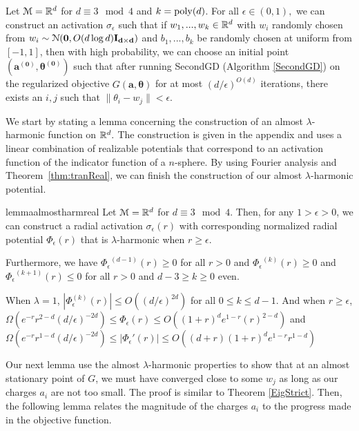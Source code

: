 %
%
\begin{theorem}\label{almostHarmSGD}
  Let $\mathcal{M} = {\mathbb{R}}^{d}$ for $d \equiv 3 \mod 4$ and
  $k = \mathrm{poly}(d)$. For all $\epsilon \in (0,1),$ we can construct an
  activation $\sigma_\epsilon$ such that if $w_1,...,w_k \in {\mathbb{R}}^d$
  with $w_i$ randomly chosen from
  $w_i \sim \mathcal{N}({\bf 0}, O(d\log d){\bf I_{d\times d}})$ and
  $b_1,...,b_k$ be randomly chosen at uniform from $[-1,1]$, then with
  high probability, we can choose an initial point
  $(\boldsymbol{a^{(0)}, \theta^{(0)}})$ such that after running
  SecondGD (Algorithm \ref{SecondGD}) on the regularized objective
  $G(\boldsymbol{a,\theta})$ for at most $(d/\epsilon)^{O(d)}$
  iterations, there exists an $i, j$ such that
  $\|\theta_i - w_j\| < \epsilon$.
\end{theorem}
%
We start by stating a lemma concerning the construction of an almost
$\lambda$-harmonic function on ${\mathbb{R}}^d.$ The construction is given in the appendix and uses a linear combination of realizable potentials that correspond to an activation function of the indicator function of a $n$-sphere. By using Fourier analysis and Theorem~\ref{thm:tranReal}, we can finish the construction of our almost $\lambda$-harmonic potential.%
%
\begin{restatable}{lemma}{almostharmreal}\label{almostHarmReal}
Let $\mathcal{M} = {\mathbb{R}}^d$ for $d \equiv 3 \mod 4$. Then, for any $1 > \epsilon > 0$, we can construct a radial activation $\sigma_\epsilon(r)$ with corresponding normalized radial potential $\Phi_\epsilon(r)$ that is $\lambda$-harmonic when $r \geq \epsilon$.

Furthermore, we have ${\Phi_\epsilon}^{(d-1)}(r) \geq 0$ for all $r  > 0$ and ${\Phi_\epsilon}^{(k)}(r) \geq 0$ and ${\Phi_\epsilon}^{(k+1)}(r)\leq 0$ for all $r > 0$ and $d - 3 \geq k \geq 0 $ even. 

When $\lambda = 1$, $|{\Phi}_\epsilon^{(k)}(r)| \leq O((d/\epsilon)^{2d})$ for all $0 \leq k \leq d-1$. And when $r \geq \epsilon$, $\Omega(e^{-r}r^{2-d}(d/\epsilon)^{-2d}) \leq {\Phi}_\epsilon(r) \leq O((1+r)^de^{1-r}(r)^{2-d})$ and $ \Omega(e^{-r}r^{1-d}(d/\epsilon)^{-2d}) \leq |{\Phi}_\epsilon'(r)| \leq O((d+r)(1+ r)^de^{1- r} r^{1-d})$
\end{restatable}
%
%
Our next lemma use the almost $\lambda$-harmonic properties to show that at an almost stationary point of $G$, we must have converged close to some $w_j$ as long as our charges $a_i$ are not too small. The proof is similar to Theorem \ref{EigStrict}. Then, the following lemma relates the magnitude of the charges $a_i$ to the progress made in the objective function. 
